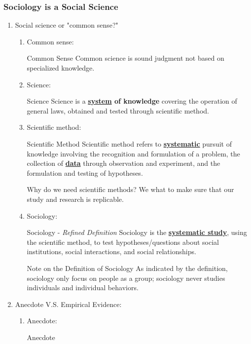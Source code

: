 \documentclass[12pt,a4paper]{article}
\begin{document}
\subsubsection{Sociology is a Social Science}
\begin{enumerate}
	\item Social science or "common sense?"
	\begin{enumerate}
		\item Common sense:
		\begin{df}{Common Sense}
			Common science is sound  judgment not based on specialized knowledge. 
		\end{df}
		\item Science: 
		\begin{df}{Science}
			Science is a \textbf{\underline{system} of knowledge} covering the operation of general laws, obtained and tested through scientific method.
		\end{df}
		\item Scientific method: 
		\begin{df}{Scientific Method}
			Scientific method refers to \textbf{\underline{systematic}} pursuit of knowledge involving the recognition and formulation of a problem, the collection of \textbf{\underline{data}} through observation and experiment, and the formulation and testing of hypotheses.
		\end{df}
		\begin{ext}{Why do we need scientific methods? }
			We what to make sure that our study and research is replicable. 
		\end{ext}
		\item Sociology: 
		\begin{df}{Sociology - \textit{Refined Definition}}
			Sociology is the \textbf{\underline{systematic study}}, using the scientific method, to test hypotheses/questions about social institutions, social interactions, and social relationships.  
		\end{df}
		\begin{rmk}{Note on the Definition of Sociology}
			As indicated by the definition, sociology only focus on people as a group; sociology never studies individuals and individual behaviors. 
		\end{rmk}
	\end{enumerate}
	\item Anecdote V.S. Empirical Evidence: 
	\begin{enumerate}
		\item Anecdote: 
		\begin{df}{Anecdote}

\end{df}
\end{enumerate}
\end{enumerate}
\end{document}
